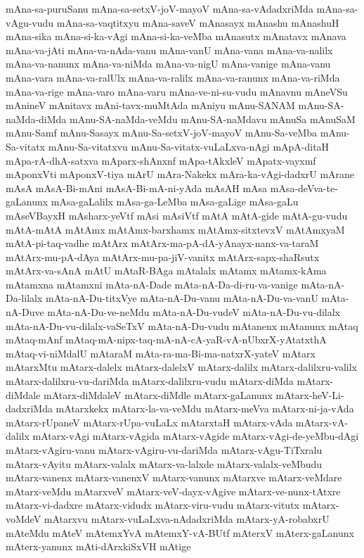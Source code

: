 {mAna-sa-puruSanu
mAna-sa-setxV-joV-mayoV
mAna-sa-vAdadxriMda
mAna-sa-vAgu-vudu
mAna-sa-vaqtitxyu
mAna-saveV
mAnasayx
mAnashu
mAnashuH
mAna-sika
mAna-si-ka-vAgi
mAna-si-ka-veMba
mAnasutx
mAnatavx
mAnava
mAna-va-jAti
mAna-va-nAda-vanu
mAna-vanU
mAna-vana
mAna-va-nalilx
mAna-va-nanunx
mAna-va-niMda
mAna-va-nigU
mAna-vanige
mAna-vanu
mAna-vara
mAna-va-ralUlx
mAna-va-ralilx
mAna-va-ranunx
mAna-va-riMda
mAna-va-rige
mAna-varo
mAna-varu
mAna-ve-ni-su-vudu
mAnavnu
mAneVSu
mAnineV
mAnitavx
mAni-tavx-muMtAda
mAniyu
mAnu-SANAM
mAnu-SA-naMda-diMda
mAnu-SA-naMda-veMdu
mAnu-SA-naMdavu
mAnuSa
mAnuSaM
mAnu-Samf
mAnu-Sasayx
mAnu-Sa-setxV-joV-mayoV
mAnu-Sa-veMba
mAnu-Sa-vitatx
mAnu-Sa-vitatxvu
mAnu-Sa-vitatx-vuLaLxva-nAgi
mApA-ditaH
mApa-rA-dhA-satxva
mAparx-shAnxnf
mApa-tAkxleV
mApatx-vayxmf
mAponxVti
mAponxV-tiya
mArU
mAra-Nakekx
mAra-ka-vAgi-dadxrU
mArane
mAsA
mAsA-Bi-mAni
mAsA-Bi-mA-ni-yAda
mAsAH
mAsa
mAsa-deVva-te-gaLanunx
mAsa-gaLalilx
mAsa-ga-LeMba
mAsa-gaLige
mAsa-gaLu
mAseVBayxH
mAsharx-yeVtf
mAsi
mAsiVtf
mAtA
mAtA-gide
mAtA-gu-vudu
mAtA-mAtA
mAtAmx
mAtAmx-barxhamx
mAtAmx-sitxtevxV
mAtAmxyaM
mAtA-pi-taq-vadhe
mAtArx
mAtArx-ma-pA-dA-yAnayx-nanx-va-taraM
mAtArx-mu-pA-dAya
mAtArx-mu-pa-jiV-vanitx
mAtArx-sapx-shaRsutx
mAtArx-va-sAnA
mAtU
mAtaR-BAga
mAtalalx
mAtamx
mAtamx-kAma
mAtamxna
mAtamxni
mAta-nA-Dade
mAta-nA-Da-di-ru-va-vanige
mAta-nA-Da-lilalx
mAta-nA-Du-titxVye
mAta-nA-Du-vanu
mAta-nA-Du-va-vanU
mAta-nA-Duve
mAta-nA-Du-ve-neMdu
mAta-nA-Du-vudeV
mAta-nA-Du-vu-dilalx
mAta-nA-Du-vu-dilalx-vaSeTxV
mAta-nA-Du-vudu
mAtanenx
mAtanunx
mAtaq
mAtaq-mAnf
mAtaq-mA-nipx-taq-mA-nA-cA-yaR-vA-nUbxrX-yAtatxthA
mAtaq-vi-niMdalU
mAtaraM
mAta-ra-ma-Bi-ma-natxrX-yateV
mAtarx
mAtarxMtu
mAtarx-dalelx
mAtarx-dalelxV
mAtarx-dalilx
mAtarx-dalilxru-valilx
mAtarx-dalilxru-vu-dariMda
mAtarx-dalilxru-vudu
mAtarx-diMda
mAtarx-diMdale
mAtarx-diMdaleV
mAtarx-diMdle
mAtarx-gaLanunx
mAtarx-heV-Li-dadxriMda
mAtarxkekx
mAtarx-la-va-veMdu
mAtarx-meVva
mAtarx-ni-ja-vAda
mAtarx-rUpaneV
mAtarx-rUpa-vuLaLx
mAtarxtaH
mAtarx-vAda
mAtarx-vA-dalilx
mAtarx-vAgi
mAtarx-vAgida
mAtarx-vAgide
mAtarx-vAgi-de-yeMbu-dAgi
mAtarx-vAgiru-vanu
mAtarx-vAgiru-vu-dariMda
mAtarx-vAgu-TiTxralu
mAtarx-vAyitu
mAtarx-valalx
mAtarx-va-lalxde
mAtarx-valalx-veMbudu
mAtarx-vanenx
mAtarx-vanenxV
mAtarx-vanunx
mAtarxve
mAtarx-veMdare
mAtarx-veMdu
mAtarxveV
mAtarx-veV-dayx-vAgive
mAtarx-ve-nunx-tAtxre
mAtarx-vi-dadxre
mAtarx-vidudx
mAtarx-viru-vudu
mAtarx-vitutx
mAtarx-voMdeV
mAtarxvu
mAtarx-vuLaLxva-nAdadxriMda
mAtarx-yA-robabxrU
mAteMdu
mAteV
mAtemxYvA
mAtemxY-vA-BUtf
mAterxV
mAterx-gaLanunx
mAterx-yanunx
mAti-dArxkiSxVH
mAtige
}
